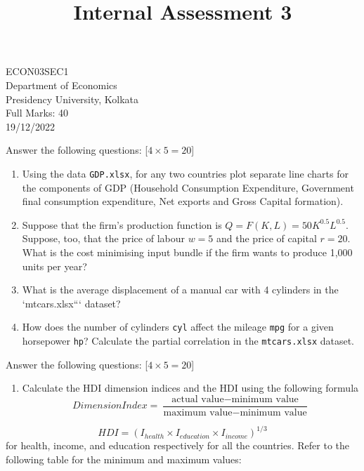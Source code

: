 \documentclass[
]{article}
\title{Internal Assessment 3}
\author{}
\date{\vspace{-2.5em}}
\providecommand{\tightlist}{%
  \setlength{\itemsep}{0pt}\setlength{\parskip}{0pt}}
\begin{document}
\maketitle

\begin{center}
{\Large ECON03SEC1}\\
{\Large Department of Economics}\\
{\Large Presidency University, Kolkata}\\
{\large Full Marks: 40}\\
{\large 19/12/2022}
\end{center}

Answer the following questions: {[}\(4 \times 5 = 20\){]}

\begin{enumerate}
\def\labelenumi{\arabic{enumi}.}
\tightlist
\item
  Using the data \texttt{GDP.xlsx}, for any two countries plot separate
  line charts for the components of GDP (Household Consumption
  Expenditure, Government final consumption expenditure, Net exports and
  Gross Capital formation).
\item
  Suppose that the firm's production function is
  \(Q = F(K, L) = 50K^{0.5}L^{0.5}\). Suppose, too, that the price of
  labour \(w=5\) and the price of capital \(r=20\). What is the cost
  minimising input bundle if the firm wants to produce 1,000 units per
  year?
\item
  What is the average displacement of a manual car with 4 cylinders in
  the `mtcars.xlsx``` dataset?
\item
  How does the number of cylinders \texttt{cyl} affect the mileage
  \texttt{mpg} for a given horsepower \texttt{hp}? Calculate the partial
  correlation in the \texttt{mtcars.xlsx} dataset.
\end{enumerate}

Answer the following questions: {[}\(4 \times 5 = 20\){]}

\begin{enumerate}
\def\labelenumi{\arabic{enumi}.}
\setcounter{enumi}{4}
\tightlist
\item
  Calculate the HDI dimension indices and the HDI using the following
  formula
  \[DimensionIndex = \frac{\text{actual value} - \text{minimum value}}{\text{maximum value} -\text{minimum value}}\]
\end{enumerate}

\[
HDI = (I_{health} \times I_{education} \times I_{income})^{1/3}
\] for health, income, and education respectively for all the countries.
Refer to the following table for the minimum and maximum values:
\end{document}
